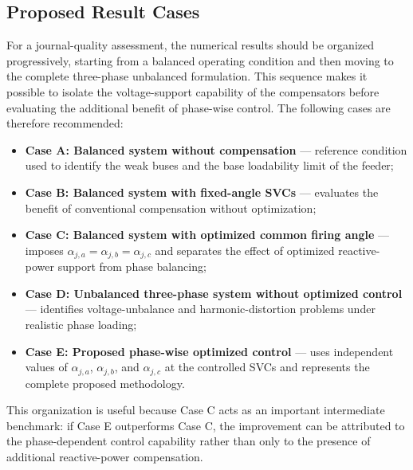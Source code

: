 
\subsection{Proposed Result Cases}
\label{subsec:proposed_result_cases}

For a journal-quality assessment, the numerical results should be organized
progressively, starting from a balanced operating condition and then moving
to the complete three-phase unbalanced formulation. This sequence makes it
possible to isolate the voltage-support capability of the compensators before
evaluating the additional benefit of phase-wise control. The following cases
are therefore recommended:

\begin{itemize}
    \item \textbf{Case A: Balanced system without compensation} --- reference
          condition used to identify the weak buses and the base loadability
          limit of the feeder;
    \item \textbf{Case B: Balanced system with fixed-angle SVCs} --- evaluates
          the benefit of conventional compensation without optimization;
    \item \textbf{Case C: Balanced system with optimized common firing angle}
          --- imposes $\alpha_{j,a}=\alpha_{j,b}=\alpha_{j,c}$ and separates
          the effect of optimized reactive-power support from phase balancing;
    \item \textbf{Case D: Unbalanced three-phase system without optimized
          control} --- identifies voltage-unbalance and harmonic-distortion
          problems under realistic phase loading;
    \item \textbf{Case E: Proposed phase-wise optimized control} --- uses
          independent values of $\alpha_{j,a}$, $\alpha_{j,b}$, and
          $\alpha_{j,c}$ at the controlled SVCs and represents the complete
          proposed methodology.
\end{itemize}

\noindent This organization is useful because Case C acts as an important
intermediate benchmark: if Case E outperforms Case C, the improvement can be
attributed to the phase-dependent control capability rather than only to the
presence of additional reactive-power compensation.

